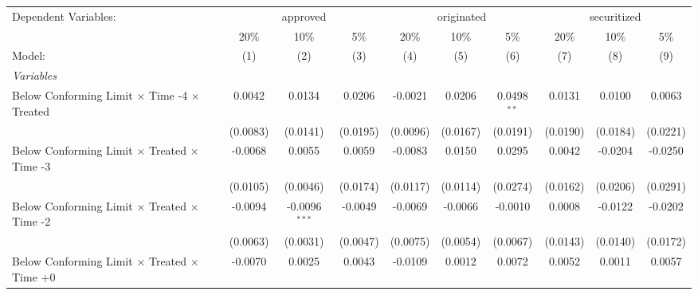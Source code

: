 \begingroup
\centering
\begin{tabular}{lccccccccc}
   \tabularnewline \midrule \midrule
   Dependent Variables: & \multicolumn{3}{c}{approved} & \multicolumn{3}{c}{originated} & \multicolumn{3}{c}{securitized}\\
                                                              & 20\%           & 10\%            & 5\%            & 20\%          & 10\%           & 5\%            & 20\%         & 10\%         & 5\% \\    
   Model:                                                     & (1)            & (2)             & (3)            & (4)           & (5)            & (6)            & (7)          & (8)          & (9)\\  
   \midrule
   \emph{Variables}\\
   Below Conforming Limit $\times$ Time -4 $\times$ Treated   & 0.0042         & 0.0134          & 0.0206         & -0.0021       & 0.0206         & 0.0498$^{**}$  & 0.0131       & 0.0100       & 0.0063\\   
                                                              & (0.0083)       & (0.0141)        & (0.0195)       & (0.0096)      & (0.0167)       & (0.0191)       & (0.0190)     & (0.0184)     & (0.0221)\\   
   Below Conforming Limit $\times$ Treated $\times$ Time -3   & -0.0068        & 0.0055          & 0.0059         & -0.0083       & 0.0150         & 0.0295         & 0.0042       & -0.0204      & -0.0250\\   
                                                              & (0.0105)       & (0.0046)        & (0.0174)       & (0.0117)      & (0.0114)       & (0.0274)       & (0.0162)     & (0.0206)     & (0.0291)\\   
   Below Conforming Limit $\times$ Treated $\times$ Time -2   & -0.0094        & -0.0096$^{***}$ & -0.0049        & -0.0069       & -0.0066        & -0.0010        & 0.0008       & -0.0122      & -0.0202\\   
                                                              & (0.0063)       & (0.0031)        & (0.0047)       & (0.0075)      & (0.0054)       & (0.0067)       & (0.0143)     & (0.0140)     & (0.0172)\\   
   Below Conforming Limit $\times$ Treated $\times$ Time +0   & -0.0070        & 0.0025          & 0.0043         & -0.0109       & 0.0012         & 0.0072         & 0.0052       & 0.0011       & 0.0057\\   

\end{tabular}
